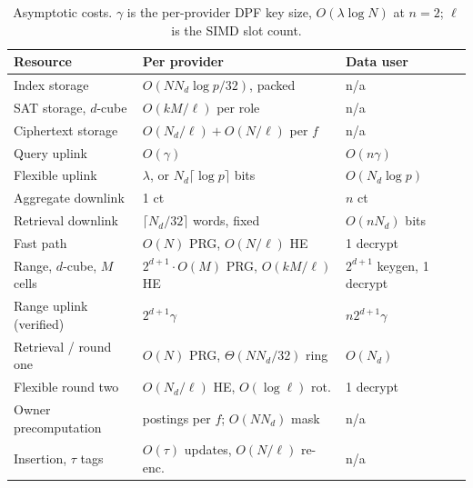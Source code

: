 \documentclass[a4paper,fleqn]{cas-sc}
\begin{document}
\begin{table}[pos=htbp]
\caption{Asymptotic costs. $\gamma$ is the per-provider DPF key size,
$O(\lambda\log N)$ at $n=2$; $\ell$ is the SIMD slot count.}
\label{tab:complexity}
\centering
\scriptsize
\setlength{\tabcolsep}{2pt}
\renewcommand{\arraystretch}{1.2}
\begin{tabular*}{\tblwidth}{@{\extracolsep{\fill}}lll@{}}
\toprule
Resource & Per provider & Data user \\
\midrule
Index storage           & $O(N N_d\log p/32)$, packed       & n/a \\
SAT storage, $d$-cube   & $O(kM/\ell)$ per role               & n/a \\
Ciphertext storage      & $O(N_d/\ell)+O(N/\ell)$ per $f$   & n/a \\
Query uplink            & $O(\gamma)$                       & $O(n\gamma)$ \\
Flexible uplink         & $\lambda$, or $N_d\lceil\log p\rceil$ bits & $O(N_d\log p)$ \\
Aggregate downlink      & 1 ct                              & $n$ ct \\
Retrieval downlink      & $\lceil N_d/32\rceil$ words, fixed & $O(nN_d)$ bits \\
Fast path               & $O(N)$ PRG, $O(N/\ell)$ HE        & 1 decrypt \\
Range, $d$-cube, $M$ cells & $2^{d+1}\cdot O(M)$ PRG, $O(kM/\ell)$ HE & $2^{d+1}$ keygen, 1 decrypt \\
Range uplink (verified) & $2^{d+1}\gamma$                   & $n2^{d+1}\gamma$ \\
Retrieval / round one   & $O(N)$ PRG, $\Theta(NN_d/32)$ ring & $O(N_d)$ \\
Flexible round two      & $O(N_d/\ell)$ HE, $O(\log\ell)$ rot.& 1 decrypt \\
Owner precomputation    & postings per $f$; $O(NN_d)$ mask  & n/a \\
Insertion, $\tau$ tags  & $O(\tau)$ updates, $O(N/\ell)$ re-enc. & n/a \\
\bottomrule
\end{tabular*}
\end{table}

\end{document}

